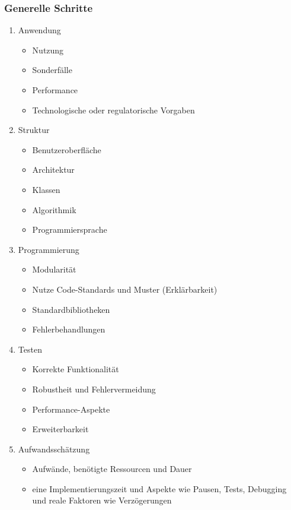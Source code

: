 \documentclass[main.tex]{subfiles}
\begin{document}
\subsubsection*{Generelle Schritte}
\begin{enumerate}
    \item Anwendung
    \begin{itemize}
        \item Nutzung
        \item Sonderfälle
        \item Performance
        \item Technologische oder regulatorische Vorgaben
    \end{itemize}
    \item Struktur
    \begin{itemize}
        \item Benutzeroberfläche
        \item Architektur
        \item Klassen
        \item Algorithmik
        \item Programmiersprache
    \end{itemize}
    \item Programmierung
    \begin{itemize}
        \item Modularität
        \item Nutze Code-Standards und Muster (Erklärbarkeit)
        \item Standardbibliotheken 
        \item Fehlerbehandlungen
    \end{itemize}
    \item Testen 
    \begin{itemize}
        \item Korrekte Funktionalität
        \item Robustheit und Fehlervermeidung
        \item Performance-Aspekte
        \item Erweiterbarkeit
    \end{itemize}
    \item Aufwandsschätzung
    \begin{itemize}
        \item Aufwände, benötigte Ressourcen und Dauer
        \item eine Implementierungszeit und Aspekte wie Pausen, Tests, Debugging und reale Faktoren wie Verzögerungen
    \end{itemize}
\end{enumerate}
\end{document}
